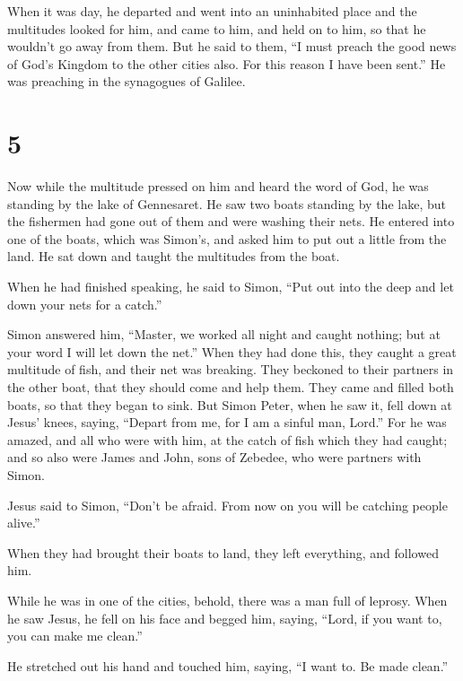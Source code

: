  When it was day, he departed and went into an uninhabited
place and the multitudes looked for him, and came to him, and held on to
him, so that he wouldn't go away from them.  But he said to
them, ``I must preach the good news of God's Kingdom to the other cities
also. For this reason I have been sent.''  He was preaching
in the synagogues of Galilee.

\hypertarget{section-4}{%
\section{5}\label{section-4}}

 Now while the multitude pressed on him and heard the word
of God, he was standing by the lake of Gennesaret.  He saw
two boats standing by the lake, but the fishermen had gone out of them
and were washing their nets.  He entered into one of the
boats, which was Simon's, and asked him to put out a little from the
land. He sat down and taught the multitudes from the boat.

 When he had finished speaking, he said to Simon, ``Put out
into the deep and let down your nets for a catch.''

 Simon answered him, ``Master, we worked all night and
caught nothing; but at your word I will let down the net.'' 
When they had done this, they caught a great multitude of fish, and
their net was breaking.  They beckoned to their partners in
the other boat, that they should come and help them. They came and
filled both boats, so that they began to sink.  But Simon
Peter, when he saw it, fell down at Jesus' knees, saying, ``Depart from
me, for I am a sinful man, Lord.''  For he was amazed, and
all who were with him, at the catch of fish which they had caught;
 and so also were James and John, sons of Zebedee, who were
partners with Simon.

Jesus said to Simon, ``Don't be afraid. From now on you will be catching
people alive.''

 When they had brought their boats to land, they left
everything, and followed him.

 While he was in one of the cities, behold, there was a man
full of leprosy. When he saw Jesus, he fell on his face and begged him,
saying, ``Lord, if you want to, you can make me clean.''

 He stretched out his hand and touched him, saying, ``I
want to. Be made clean.''

